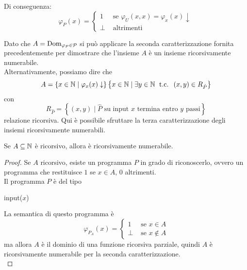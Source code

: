 Di conseguenza:
$$ 
\varphi_P (x) = \begin{cases}
	1 & \text{ se } \varphi_U (x,x) = \varphi_x (x) \downarrow \\
	\bot & \text{ altrimenti}
\end{cases}
$$

Dato che $A = \text{Dom}_{\varphi_P \in \mathcal{P}}$ si può applicare la seconda caratterizzazione fornita precedentemente per dimostrare che l'insieme $A$ è un insieme ricorsivamente numerabile. \\

Alternativamente, possiamo dire che
$$ A = \left\{x \in \mathbb{N} \mid \varphi_x (x) \downarrow \right\} \left\{x \in \mathbb{N} \mid \exists y \in \mathbb{N} \; \text{ t.c. } \; (x,y) \in R_{\hat{P}}\right\} $$
con 
$$ 
R_{\hat{P}} = \left\{(x,y) \mid \hat{P} \text{ su input } x \text{ termina entro } y \text{ passi}\right\}
$$
relazione ricorsiva. Qui è possibile sfruttare la terza caratterizzazione degli insiemi ricorsivamente numerabili.\\

\begin{theor}
	Se $A \subseteq \mathbb{N}$ è ricorsivo, allora è ricorsivamente numerabile.
\end{theor}
\begin{proof}
	Se $A$ ricorsivo, esiste un programma $P$ in grado di riconoscerlo, ovvero un programma che restituisce $1$ se $x \in A$, $0$ altrimenti.\\
	
	Il programma $P$ è del tipo
	\begin{center}
		\begin{minipage}{.4\textwidth}
			\begin{tcolorbox}[
				colback=white,
				sharp corners,
				boxrule=.3mm,
				left=20pt,
				top=0pt,
				bottom=0pt,
				title=$P$,
				colbacktitle=white,
				coltitle=black
				]
				\begin{algorithm}[H]
					\SetAlgoNoEnd
					input($x$) \\
					 
				\end{algorithm}
			\end{tcolorbox}
		\end{minipage}
	\end{center}
	
	La semantica di questo programma è 
	$$ \varphi_{P_A} (x) = \begin{cases}
		1 & \text{ se } x \in A\\
		\bot & \text{ se } x \notin A
	\end{cases}$$
	ma allora $A$ è il dominio di una funzione ricorsiva parziale, quindi $A$ è ricorsivamente numerabile per la seconda caratterizzazione.\\
\end{proof}

